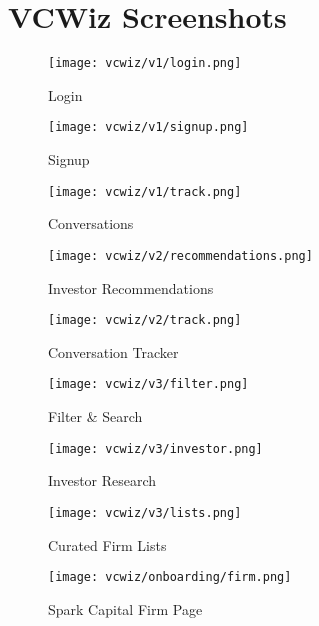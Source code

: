 \chapter{VCWiz Screenshots}

\begin{figure}[ht]
  \centering
  \texttt{[image: vcwiz/v1/login.png]}
  \caption{Login}
  \label{screenshots:v1:login}
\end{figure}

\begin{figure}[ht]
  \centering
  \texttt{[image: vcwiz/v1/signup.png]}
  \caption{Signup}
  \label{screenshots:v1:signup}
\end{figure}

\begin{figure}[ht]
  \centering
  \texttt{[image: vcwiz/v1/track.png]}
  \caption{Conversations}
  \label{screenshots:v1:conversations}
\end{figure}

\begin{figure}[ht]
  \centering
  \texttt{[image: vcwiz/v2/recommendations.png]}
  \caption{Investor Recommendations}
  \label{screenshots:v2:recs}
\end{figure}

\begin{figure}[ht]
  \centering
  \texttt{[image: vcwiz/v2/track.png]}
  \caption{Conversation Tracker}
  \label{screenshots:v2:conversations}
\end{figure}

\begin{figure}[ht]
  \centering
  \texttt{[image: vcwiz/v3/filter.png]}
  \caption{Filter \& Search}
  \label{screenshots:v3:filter}
\end{figure}

\begin{figure}[ht]
  \centering
  \texttt{[image: vcwiz/v3/investor.png]}
  \caption{Investor Research}
  \label{screenshots:v3:research}
\end{figure}

\begin{figure}[ht]
  \centering
  \texttt{[image: vcwiz/v3/lists.png]}
  \caption{Curated Firm Lists}
  \label{screenshots:v3:lists}
\end{figure}

\begin{figure}[ht]
  \centering
  \texttt{[image: vcwiz/onboarding/firm.png]}
  \caption{Spark Capital Firm Page}
  \label{screenshots:v3:onboarding}
\end{figure}

